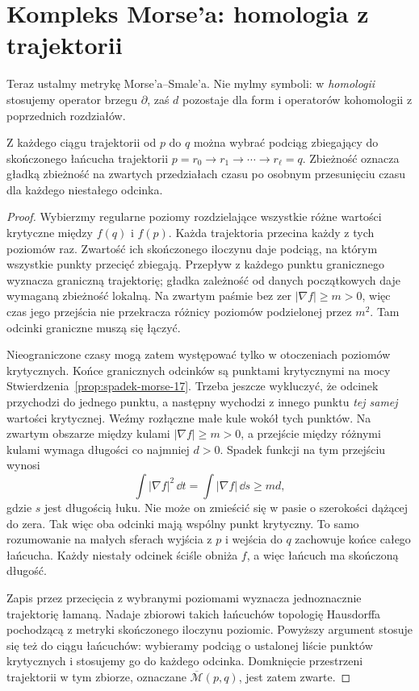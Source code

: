 \section{Kompleks Morse'a: homologia z trajektorii}
\label{sec:kompleks-morse-17}

Teraz ustalmy metrykę Morse'a--Smale'a.
Nie mylmy symboli: w \emph{homologii}
stosujemy operator brzegu $\partial$,
zaś $d$ pozostaje dla form
i operatorów kohomologii
z poprzednich rozdziałów.

\begin{lemat}
\label{lem:zwartosc-lamana-17}
Z każdego ciągu trajektorii od $p$ do $q$ można wybrać
podciąg zbiegający do skończonego łańcucha trajektorii
$p=r_0\to r_1\to\cdots\to r_\ell=q$.
Zbieżność oznacza gładką zbieżność na zwartych
przedziałach czasu po osobnym przesunięciu czasu
dla każdego niestałego odcinka.
\end{lemat}
\begin{proof}
Wybierzmy regularne poziomy rozdzielające wszystkie
różne wartości krytyczne między $f(q)$ i $f(p)$.
Każda trajektoria przecina każdy z tych poziomów raz.
Zwartość ich skończonego iloczynu daje podciąg,
na którym wszystkie punkty przecięć zbiegają.
Przepływ z każdego punktu granicznego wyznacza
graniczną trajektorię; gładka zależność od danych
początkowych daje wymaganą zbieżność lokalną.
Na zwartym paśmie bez zer $|\nabla f|\geq m>0$,
więc czas jego przejścia nie przekracza
różnicy poziomów podzielonej przez $m^2$.
Tam odcinki graniczne muszą się łączyć.

Nieograniczone czasy mogą zatem występować tylko
w otoczeniach poziomów krytycznych.
Końce granicznych odcinków są punktami krytycznymi
na mocy Stwierdzenia~\ref{prop:spadek-morse-17}.
Trzeba jeszcze wykluczyć, że odcinek przychodzi do
jednego punktu, a następny wychodzi z innego punktu
\emph{tej samej} wartości krytycznej.
Weźmy rozłączne małe kule wokół tych punktów.
Na zwartym obszarze między kulami $|\nabla f|\geq m>0$,
a przejście między różnymi kulami wymaga długości
co najmniej $d>0$. Spadek funkcji na tym przejściu wynosi
\[
 \int |\nabla f|^2\,\dd t
 =\int |\nabla f|\,\dd s\geq md,
\]
gdzie $s$ jest długością łuku. Nie może on zmieścić się
w pasie o szerokości dążącej do zera.
Tak więc oba odcinki mają wspólny punkt krytyczny.
To samo rozumowanie na małych sferach wyjścia
z $p$ i wejścia do $q$ zachowuje końce całego łańcucha.
Każdy niestały odcinek ściśle obniża $f$,
a więc łańcuch ma skończoną długość.

Zapis przez przecięcia z wybranymi poziomami
wyznacza jednoznacznie trajektorię łamaną.
Nadaje zbiorowi takich łańcuchów topologię Hausdorffa
pochodzącą z metryki skończonego iloczynu poziomic.
Powyższy argument stosuje się też do ciągu łańcuchów:
wybieramy podciąg o ustalonej liście punktów
krytycznych i stosujemy go do każdego odcinka.
Domknięcie przestrzeni trajektorii w tym zbiorze,
oznaczane $\overline{\mathcal M}(p,q)$, jest zatem zwarte.
\end{proof}


